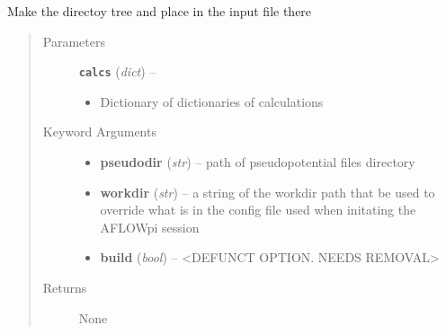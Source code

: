 \documentclass[letterpaper,10pt,english]{sphinxmanual}
\begin{document}

\begin{fulllineitems}
\label{prep:prep.maketree}
Make the directoy tree and place in the input file there
\begin{quote}\begin{description}
\item[{Parameters}] \leavevmode
\textbf{\texttt{calcs}} (\emph{dict}) -- \begin{itemize}
\item {} 
Dictionary of dictionaries of calculations

\end{itemize}


\item[{Keyword Arguments}] \leavevmode\begin{itemize}
\item {} 
\textbf{pseudodir} (\emph{str}) --
path of pseudopotential files directory

\item {} 
\textbf{workdir} (\emph{str}) --
a string of the workdir path that be used to override what is in the
config file used when initating the AFLOWpi session

\item {} 
\textbf{build} (\emph{bool}) --
\textless{}DEFUNCT OPTION. NEEDS REMOVAL\textgreater{}

\end{itemize}

\item[{Returns}] \leavevmode
None

\end{description}\end{quote}

\end{fulllineitems}

\end{document}

